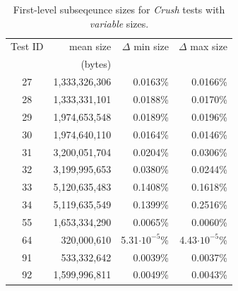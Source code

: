 \documentclass[
  digital,     %
  oneside,     %
  nosansbold,  %
  nocolorbold, %
  nolof,         %
  nolot,         %
]{fithesis4}
\begin{document}
\begin{table}[h]
  \begin{tabularx}{0.75\textwidth}{c|r|r|r}
   Test ID & mean size & $\Delta$ min size & $\Delta$ max size\\
     & (bytes) & & \\
    \midrule
    27&1,333,326,306&0.0163\%&0.0166\%\\
    28&1,333,331,101&0.0188\%&0.0170\%\\	
    29&1,974,653,548&0.0189\%&0.0196\%	\\
    30&1,974,640,110&0.0164\%&0.0146\%	\\
    31&3,200,051,704&0.0204\%&0.0306\%	\\
    32&3,199,995,653&0.0380\%&0.0244\%	\\
    33&5,120,635,483&0.1408\%&0.1618\%	\\
    34&5,119,635,549&0.1399\%&0.2516\%	\\
    55&1,653,334,290&0.0065\%&0.0060\%	\\
    64&320,000,610&5.31$\cdot10^{-5}$\% &4.43$\cdot10^{-5}$\%\\
    91&533,332,642&0.0039\%&0.0037\%	\\
    92&1,599,996,811&0.0049\%&0.0043\%\\

  \end{tabularx}
  \caption{First-level subseqeunce sizes for \emph{Crush} tests with \emph{variable} sizes.}
  \label{tab:analysis_crush_variable}
\end{table}
\end{document}
